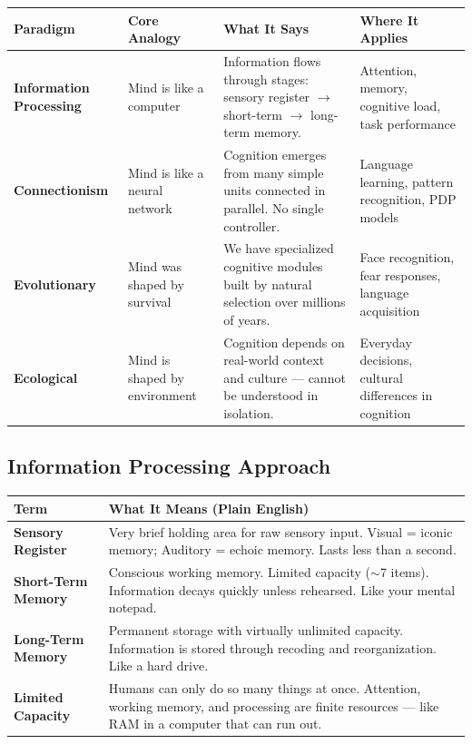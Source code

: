 \documentclass[11pt,a4paper]{article}
\newcommand{\bb}[1]{\textbf{#1}}
\begin{document}
\begin{center}
\renewcommand{\arraystretch}{1.4}
\begin{tabular}{|L{2.8cm}|L{2.8cm}|L{4.5cm}|L{4.2cm}|}
\hline
{}\color{white}\bb{Paradigm} & \color{white}\bb{Core Analogy} & \color{white}\bb{What It Says} & \color{white}\bb{Where It Applies} \\
\hline
\bb{Information Processing} & Mind is like a computer & Information flows through stages: sensory register $\to$ short-term $\to$ long-term memory. & Attention, memory, cognitive load, task performance \\
\bb{Connectionism} & Mind is like a neural network & Cognition emerges from many simple units connected in parallel. No single controller. & Language learning, pattern recognition, PDP models \\
\bb{Evolutionary} & Mind was shaped by survival & We have specialized cognitive modules built by natural selection over millions of years. & Face recognition, fear responses, language acquisition \\
\bb{Ecological} & Mind is shaped by environment & Cognition depends on real-world context and culture --- cannot be understood in isolation. & Everyday decisions, cultural differences in cognition \\
\hline
\end{tabular}
\end{center}

\subsection*{Information Processing Approach}

\begin{center}
\renewcommand{\arraystretch}{1.4}
\begin{tabular}{|L{3cm}|L{12.2cm}|}
\hline
{}\color{white}\bb{Term} & \color{white}\bb{What It Means (Plain English)} \\
\hline
\bb{Sensory Register} & Very brief holding area for raw sensory input. Visual = iconic memory; Auditory = echoic memory. Lasts less than a second. \\
\bb{Short-Term Memory} & Conscious working memory. Limited capacity ($\sim$7 items). Information decays quickly unless rehearsed. Like your mental notepad. \\
\bb{Long-Term Memory} & Permanent storage with virtually unlimited capacity. Information is stored through recoding and reorganization. Like a hard drive. \\
\bb{Limited Capacity} & Humans can only do so many things at once. Attention, working memory, and processing are finite resources --- like RAM in a computer that can run out. \\
\hline
\end{tabular}
\end{center}
\end{document}
